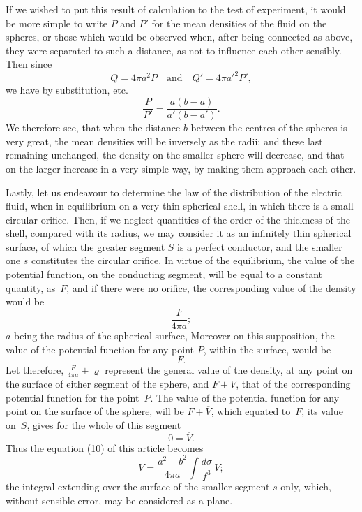 \documentclass[11pt,notitlepage]{amsart}
\renewcommand{\rho}{\varrho}
\begin{document}
If we wished to put this result of calculation to the test of experiment,
it would be more simple to write $P$ and $P'$ for the mean densities of the
fluid on the spheres, or those which would be observed when, after being
connected as above, they were separated to such a distance, as not to influence
each other sensibly. Then since
\[
Q=4\pi a^2P \quad\text{and}\quad Q'=4\pi a'^2P',
\]
we have by substitution, etc.
\[
\frac{P}{P'}=\frac{a(b-a)}{a'(b-a')}.
\]
We therefore see, that when the distance $b$ between the centres of the spheres
is very great, the mean densities will be inversely as the radii; and these
last remaining unchanged, the density on the smaller sphere will decrease,
and that on the larger increase in a very simple way, by making them approach
each other.

Lastly, let us endeavour to determine the law of the distribution of
the electric fluid, when in equilibrium on a very thin spherical shell, in which
there is a small circular orifice. Then, if we neglect quantities of the order
of the thickness of the shell, compared with its radius, we may consider it
as an infinitely thin spherical surface, of which the greater segment $S$ is a
perfect conductor, and the smaller one $s$ constitutes the circular orifice. In
virtue of the equilibrium,
the value of the potential function, on the conducting
segment, will be equal to a constant quantity, as~$F$, and if there were no
orifice, the corresponding value of the density would be
\[
\frac{F}{4\pi a};
\]
$a$ being the radius of the spherical surface, Moreover on this supposition,
the value of the potential function for any point $P$,
within the surface, would be
\[
F.
\]
Let therefore, $\frac{F}{4\pi a}+\rho$ represent
the general value of the density, at any point
on the surface of either segment of the sphere,
and $F+V$, that of the corresponding
potential function for the point~$P$. The value of the potential
function for any point on the surface of the sphere,
will be ${F+\overline{V}}$, which
equated to~$F$, its value on~$S$, gives for the whole of this segment
\[
0=\overline{V}.
\]
Thus the equation (10) of this article becomes
\[
V=\frac{a^2-b^2}{4\pi a}\int\frac{d\sigma}{f^3}\,\overline{V};
\]
the integral extending over the surface of the smaller segment $s$ only, which,
without sensible error, may be considered as a plane.
\end{document}
